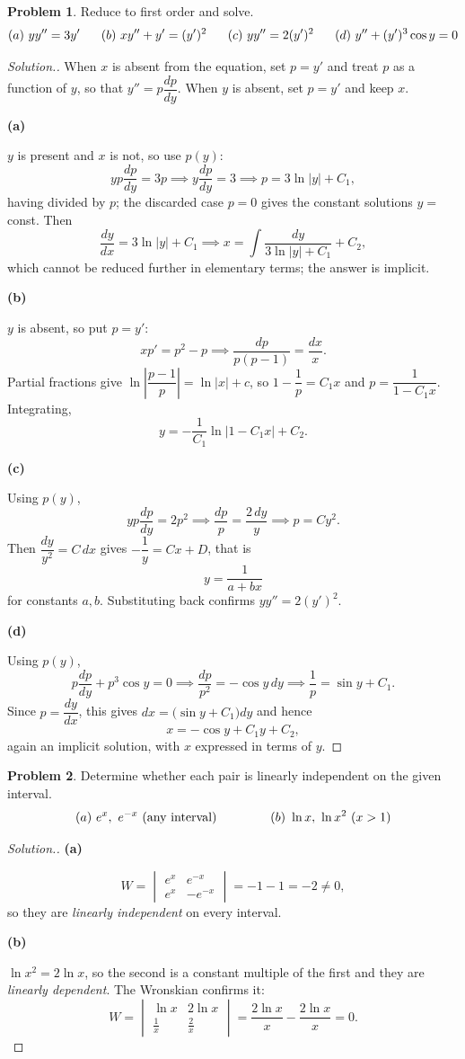 \documentclass[11pt,a4paper]{article}
\theoremstyle{definition}
\newtheorem{problemx}{Problem}[subsection]
\newenvironment{problem}{\begin{problemx}}{\end{problemx}}
\newenvironment{solution}
  {\renewcommand{\qedsymbol}{}\begin{proof}[\textit{Solution}.]}
  {\end{proof}}
\newcommand{\subhead}[1]{%
  \par\medskip\noindent\textbf{#1}\par\nobreak\smallskip}
\begin{document}
\begin{problem}
Reduce to first order and solve.
$$(a)\ yy'' = 3y'\hspace{0.6cm}(b)\ xy''+y' = (y')^2\hspace{0.6cm}
(c)\ yy'' = 2(y')^2\hspace{0.6cm}(d)\ y''+(y')^3\cos y = 0$$
\end{problem}
\begin{solution}
When $x$ is absent from the equation, set $p = y'$ and treat $p$ as a function
of $y$, so that $y'' = p\dfrac{dp}{dy}$. When $y$ is absent, set $p = y'$ and
keep $x$.

\subhead{(a)} $y$ is present and $x$ is not, so use $p(y)$:
$$yp\frac{dp}{dy} = 3p \implies y\frac{dp}{dy} = 3
\implies p = 3\ln\left|y\right| + C_1 ,$$
having divided by $p$; the discarded case $p=0$ gives the constant solutions
$y = $ const. Then
$$\frac{dy}{dx} = 3\ln\left|y\right|+C_1
\implies x = \int\frac{dy}{3\ln\left|y\right|+C_1} + C_2 ,$$
which cannot be reduced further in elementary terms; the answer is implicit.

\subhead{(b)} $y$ is absent, so put $p = y'$:
$$xp' = p^2-p \implies \frac{dp}{p(p-1)} = \frac{dx}{x}.$$
Partial fractions give
$\ln\left|\dfrac{p-1}{p}\right| = \ln\left|x\right| + c$, so
$1 - \dfrac1p = C_1x$ and $p = \dfrac{1}{1-C_1x}$. Integrating,
$$y = -\frac{1}{C_1}\ln\left|1-C_1x\right| + C_2 .$$

\subhead{(c)} Using $p(y)$,
$$yp\frac{dp}{dy} = 2p^2 \implies \frac{dp}{p} = \frac{2\,dy}{y}
\implies p = C y^2 .$$
Then $\dfrac{dy}{y^2} = C\,dx$ gives $-\dfrac1y = Cx + D$, that is
$$y = \frac{1}{a+bx}$$
for constants $a,b$. Substituting back confirms $yy'' = 2(y')^2$.

\subhead{(d)} Using $p(y)$,
$$p\frac{dp}{dy} + p^3\cos y = 0
\implies \frac{dp}{p^2} = -\cos y\,dy
\implies \frac1p = \sin y + C_1 .$$
Since $p = \dfrac{dy}{dx}$, this gives
$dx = \big(\sin y + C_1\big)dy$ and hence
$$x = -\cos y + C_1y + C_2 ,$$
again an implicit solution, with $x$ expressed in terms of $y$.
\end{solution}

\begin{problem}
Determine whether each pair is linearly independent on the given interval.
$$(a)\ e^x,\ e^{-x}\ \text{(any interval)}\hspace{1.5cm}
(b)\ \ln x,\ \ln x^2\ (x>1)$$
\end{problem}
\begin{solution}
\subhead{(a)}
$$W = \begin{vmatrix} e^x & e^{-x}\\ e^x & -e^{-x}\end{vmatrix}
= -1 - 1 = -2 \neq 0 ,$$
so they are \emph{linearly independent} on every interval.

\subhead{(b)}
$\ln x^2 = 2\ln x$, so the second is a constant multiple of the first and they
are \emph{linearly dependent}. The Wronskian confirms it:
$$W = \begin{vmatrix} \ln x & 2\ln x\\ \frac1x & \frac2x\end{vmatrix}
= \frac{2\ln x}{x} - \frac{2\ln x}{x} = 0 .$$
\end{solution}
\end{document}
